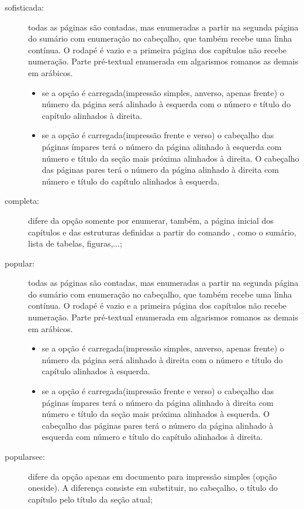 \begin{description}
      \begin{description}
      \item[sofisticada:] todas as páginas são contadas, mas enumeradas a partir na segunda página do sumário com enumeração no cabeçalho, que também recebe uma linha contínua. O rodapé é vazio e a primeira página dos capítulos não recebe numeração. Parte pré-textual enumerada em algarismos romanos as demais em arábicos.
      \begin{itemize}
      	\item se a opção  é carregada(impressão simples, anverso,
      	     apenas frente) o número da página será alinhado à esquerda com o número e título do capítulo alinhados à direita.
      	\item se a opção  é carregada(impressão frente e verso)
      	     o cabeçalho das páginas ímpares terá o número da página alinhado à esquerda com número e título da seção mais próxima alinhados à direita. O cabeçalho das páginas pares terá o número da página alinhado à direita com número e título do capítulo alinhados à esquerda.
      \end{itemize}
      \item[completa:] difere da opção  somente por enumerar, também, a página inicial dos capítulos e das estruturas definidas a partir do comando , como o sumário, lista de tabelas, figuras,$\ldots$;
      \item[popular:] todas as páginas são contadas, mas enumeradas a partir na segunda página do sumário com enumeração no cabeçalho, que também recebe uma linha contínua. O rodapé é vazio e a primeira página dos capítulos não recebe numeração. Parte pré-textual enumerada em algarismos romanos as demais em arábicos.
      \begin{itemize}
      	\item se a opção  é carregada(impressão simples, anverso,
      	apenas frente) o número da página será alinhado à direita com o número e título do capítulo alinhados à esquerda.
      	\item se a opção  é carregada(impressão frente e verso)
      	o cabeçalho das páginas ímpares terá o número da página alinhado à direita com número e título da seção mais próxima alinhados à esquerda. O cabeçalho das páginas pares terá o número da página alinhado à esquerda com número e título do capítulo alinhados à direita.
      \end{itemize}
      \item[popularsec:] difere da opção  apenas em documento para impressão simples (opção oneside). A diferença consiste em substituir, no cabeçalho, o título do capítulo pelo título da seção atual;

\end{description}
\end{description}

